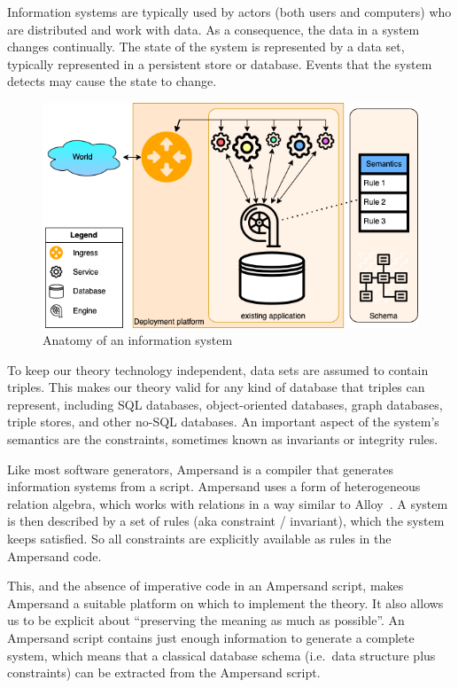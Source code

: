 \documentclass[runningheads]{llncs}
\begin{document}
   Information systems are typically used by actors (both users and computers) who are distributed and work with data.
   As a consequence, the data in a system changes continually.
   The state of the system is represented by a data set, typically represented in a persistent store or database.
   Events that the system detects may cause the state to change.
\begin{figure}[bht]
   \begin{center}
     \includegraphics[scale=.45]{figures/datamigration-Pre-migration.png}
   \end{center}
\caption{Anatomy of an information system}
\label{fig:pre-migration}
\end{figure}
   To keep our theory technology independent, data sets are assumed to contain triples.
   This makes our theory valid for any kind of database that triples can represent,
   including SQL databases, object-oriented databases, graph databases, triple stores, and other no-SQL databases.
   An important aspect of the system's semantics are the constraints, sometimes known as invariants or integrity rules.

   Like most software generators, Ampersand is a compiler that generates information systems from a script.
   Ampersand uses a form of heterogeneous relation algebra,
   which works with relations in a way similar to Alloy~\cite{Alloy2006}.
   A system is then described by a set of rules (aka constraint / invariant), which the system keeps satisfied.
   So all constraints are explicitly available as rules in the Ampersand code.

   This, and the absence of imperative code in an Ampersand script, makes Ampersand a suitable platform on which to implement the theory.
   It also allows us to be explicit about ``preserving the meaning as much as possible''.
   An Ampersand script contains just enough information to generate a complete system,
   which means that a classical database schema (i.e.\ data structure plus constraints) can be extracted from the Ampersand script.
\end{document}

